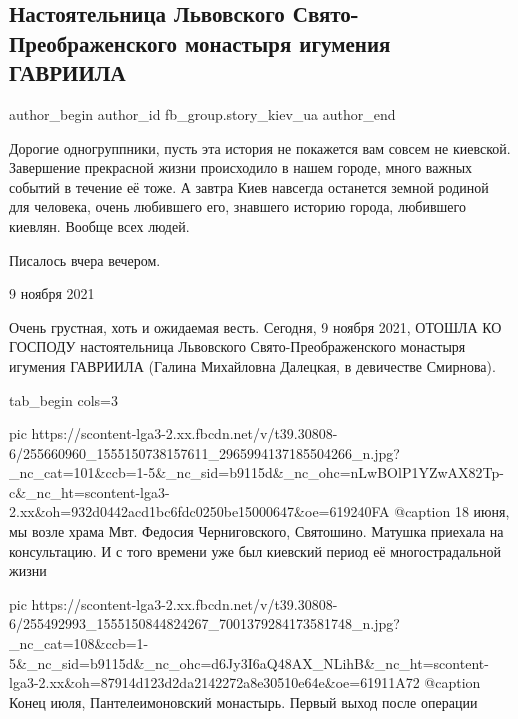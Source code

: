 
 
 
 
 
 
\subsection{Настоятельница Львовского Свято-Преображенского монастыря игумения ГАВРИИЛА}
\label{sec:10_11_2021.fb.fb_group.story_kiev_ua.3.igumenia_gavriila}
 
\ifcmt
 author_begin
   author_id fb_group.story_kiev_ua
 author_end
\fi

Дорогие одногруппники, пусть эта история не покажется вам совсем не киевской.
Завершение прекрасной жизни происходило в нашем городе, много важных событий в
течение её тоже. А завтра Киев навсегда останется земной родиной для человека,
очень любившего его, знавшего историю города, любившего киевлян. Вообще всех
людей. 

Писалось вчера вечером.

9 ноября 2021

Очень грустная, хоть и ожидаемая весть. Сегодня, 9 ноября 2021,  ОТОШЛА КО
ГОСПОДУ настоятельница Львовского Свято-Преображенского монастыря игумения
ГАВРИИЛА (Галина Михайловна Далецкая, в девичестве Смирнова).

\ifcmt
  tab_begin cols=3

     pic https://scontent-lga3-2.xx.fbcdn.net/v/t39.30808-6/255660960_1555150738157611_2965994137185504266_n.jpg?_nc_cat=101&ccb=1-5&_nc_sid=b9115d&_nc_ohc=nLwBOlP1YZwAX82Tp-c&_nc_ht=scontent-lga3-2.xx&oh=932d0442acd1bc6fdc0250be15000647&oe=619240FA
		 @caption 18 июня, мы возле храма Мвт. Федосия Черниговского, Святошино. Матушка приехала на консультацию. И с того времени уже был киевский период её многострадальной жизни

     pic https://scontent-lga3-2.xx.fbcdn.net/v/t39.30808-6/255492993_1555150844824267_7001379284173581748_n.jpg?_nc_cat=108&ccb=1-5&_nc_sid=b9115d&_nc_ohc=d6Jy3I6aQ48AX_NLihB&_nc_ht=scontent-lga3-2.xx&oh=87914d123d2da2142272a8e30510e64e&oe=61911A72
		 @caption Конец июля, Пантелеимоновский монастырь. Первый выход после операции


